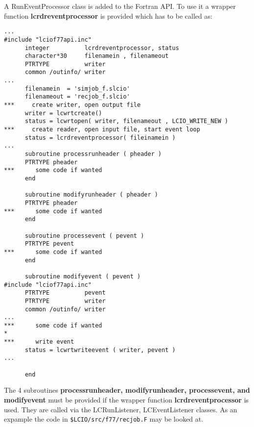 A RunEventProcessor class is added to the Fortran API. To use it a wrapper function {\bf lcrdreventprocessor}
is provided which has to be called as:
\begin{verbatim}
...
#include "lciof77api.inc"
      integer          lcrdreventprocessor, status
      character*30     filenamein , filenameout
      PTRTYPE          writer
      common /outinfo/ writer
...
      filenamein  = 'simjob_f.slcio'
      filenameout = 'recjob_f.slcio'
***     create writer, open output file
      writer = lcwrtcreate()
      status = lcwrtopen( writer, filenameout , LCIO_WRITE_NEW )
***     create reader, open input file, start event loop
      status = lcrdreventprocessor( fileinamein )
...
      subroutine processrunheader ( pheader )
      PTRTYPE pheader
***      some code if wanted
      end

      subroutine modifyrunheader ( pheader )
      PTRTYPE pheader
***      some code if wanted
      end

      subroutine processevent ( pevent )
      PTRTYPE pevent
***      some code if wanted
      end

      subroutine modifyevent ( pevent )
#include "lciof77api.inc"
      PTRTYPE          pevent
      PTRTYPE          writer
      common /outinfo/ writer
...
***      some code if wanted
*
***      write event
      status = lcwrtwriteevent ( writer, pevent )
...

      end
\end{verbatim}

The 4 subroutines {\bf processrunheader, modifyrunheader, processevent, and modifyevent} must be provided if
the wrapper function {\bf lcrdreventprocessor} is used. They are called via the LCRunListener, LCEventListener classes.
As an expample the code in \verb#$LCIO/src/f77/recjob.F# may be looked at.

